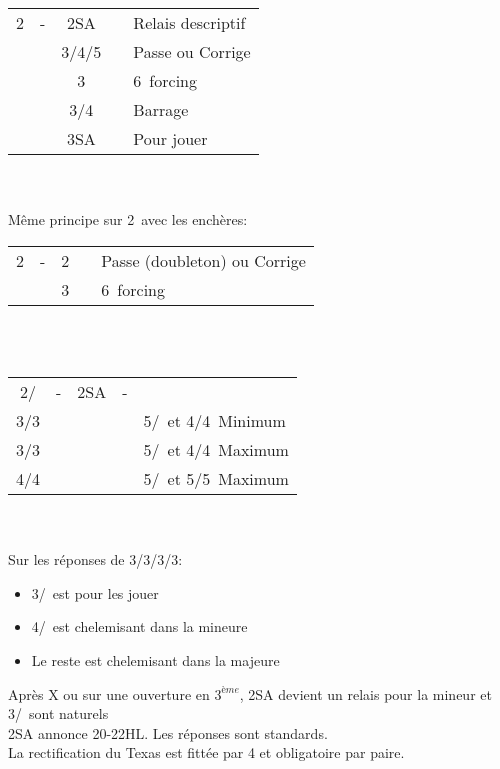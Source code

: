 \documentclass[a4paper, oneside, 11pt]{report}
\begin{document}
	\begin{tabular}{cccc|l}
	2\pique & - & 2SA && Relais descriptif\\
	&& 3\trefle/4\trefle/5\trefle && Passe ou Corrige\\
	&& 3\coeur && 6\coeur\ forcing\\
	&& 3\pique/4\pique && Barrage\\
	&& 3SA && Pour jouer\\
	\end{tabular}\\\\
	
	Même principe sur 2\coeur\ avec les enchères:
	\begin{tabular}{cccc|l}
	2\coeur & - & 2\pique && Passe (doubleton) ou Corrige\\
	&& 3\pique && 6\pique\ forcing\\
	\end{tabular}\\\\

	\begin{tabular}{cccc|l}
	2\coeur/\pique & - & 2SA & - &\\
	3\trefle/3\carreau &&&& 5\coeur/\pique\ et 4\trefle/4\carreau\ Minimum\\
	3\coeur/3\pique &&&& 5\coeur/\pique\ et 4\trefle/4\carreau\ Maximum\\
	4\trefle/4\carreau &&&& 5\coeur/\pique\ et 5\trefle/5\carreau\ Maximum\\
	\end{tabular}\\\\
	
	Sur les réponses de 3\trefle/3\carreau/3\coeur/3\pique:
	\begin{itemize}
	\item 3\coeur/\pique\ est pour les jouer
	\item 4\trefle/\carreau\ est chelemisant dans la mineure
	\item Le reste est chelemisant dans la majeure\\
	\end{itemize}
	
	Après X ou sur une ouverture en $3^{ème}$, 2SA devient un relais pour la mineur et 3\trefle/\carreau\ sont naturels\\

	2SA annonce 20-22HL. Les réponses sont standards. \\
La rectification du Texas est fittée par 4 et obligatoire par paire.\\
\end{document}
